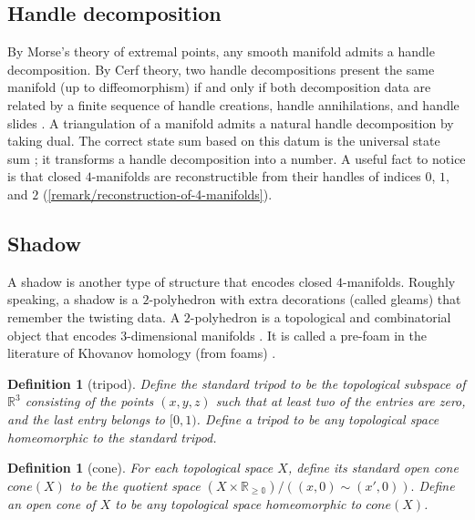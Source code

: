\documentclass[12pt]{extarticle}
\numberwithin{equation}{section} %
\theoremstyle{mystyle}
\newtheorem{definition}[equation]{Definition}
\begin{document}
\subsection{Handle decomposition}

\noindent By Morse's theory of extremal points, any smooth
manifold admits a handle decomposition. By Cerf theory, two
handle decompositions present the same manifold (up to
diffeomorphism) if and only if both decomposition data are
related by a finite sequence of handle creations, handle
annihilations, and handle slides
\cite{gompf-stipsicz/4-manifolds-and-kirby-calculus}. A
triangulation of a manifold admits a natural handle decomposition
by taking dual. The correct state sum based on this datum is the
universal state sum \cite{walker/universal-state-sum}; it
transforms a handle decomposition into a number. A useful fact to
notice is that closed $4$-manifolds are reconstructible from
their handles of indices $0$, $1$, and $2$
(\ref{remark/reconstruction-of-4-manifolds}).

\subsection{Shadow}


\noindent A shadow is another type of structure that encodes
closed $4$-manifolds. Roughly speaking, a shadow is a
$2$-polyhedron with extra decorations (called gleams) that
remember the twisting data. A $2$-polyhedron is a topological and
combinatorial object that encodes $3$-dimensional manifolds
\cite{matveev/algorithmic-topology-and-classification-of-3-manifolds}.
It is called a pre-foam in the literature of Khovanov homology
(from foams) \cite{khovanov-robert/foam}.

\begin{definition}[tripod]\label{def/tripod}
  Define the standard tripod to be the topological subspace of
  $\mathbb{R}^{3}$ consisting of the points $(x,y,z)$ such that
  at least two of the entries are zero, and the last entry
  belongs to $[0,1)$. Define a tripod to be any topological space
  homeomorphic to the standard tripod.
\end{definition}

\begin{definition}[cone]\label{def/cone}
  For each topological space $X$, define its standard open cone
  $cone(X)$ to be the quotient space
  $(X \times \mathbb{R_{\geq 0}})/((x,0) \sim (x',0)).$ Define an
  open cone of $X$ to be any topological space homeomorphic to
  $cone(X)$.
\end{definition}
\end{document}
